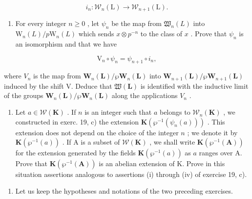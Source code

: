 \[
i _ {n}: \mathcal {W} _ {n} (\mathrm{L}) \rightarrow \mathcal {W} _ {n + 1} (\mathrm{L}).
\]

\begin{enumerate}
\def\labelenumi{\alph{enumi})}
\setcounter{enumi}{1}
\tightlist
\item
  For every integer \(n \geqslant 0\) , let \(\psi_n\) be the map from \(\mathfrak{W}_n(L)\) into \(\mathrm{W}_n(L)/p\mathrm{W}_n(L)\) which sends \(x \otimes p^{-n}\) to the class of \(x\) . Prove that \(\psi_n\) is an isomorphism and that we have
\end{enumerate}

\[
\mathrm{V} _ {n} \circ \psi_ {n} = \psi_ {n + 1} \circ i _ {n},
\]

where \(V_{n}\) is the map from \(\mathbf{W}_{n}(\mathbf{L})/\wp\mathbf{W}_{n}(\mathbf{L})\) into \(\mathbf{W}_{n+1}(\mathbf{L})/\wp\mathbf{W}_{n+1}(\mathbf{L})\) induced by the shift V. Deduce that \(\mathfrak{W}(\mathbf{L})\) is identified with the inductive limit of the groups \(\mathbf{W}_{n}(\mathbf{L})/\wp\mathbf{W}_{n}(\mathbf{L})\) along the applications \(V_{n}\) .

\begin{enumerate}
\def\labelenumi{\alph{enumi})}
\setcounter{enumi}{2}
\tightlist
\item
  Let \(a \in \mathcal{W}(\mathbf{K})\) . If \(n\) is an integer such that \(a\) belongs to \(\mathcal{W}_n(\mathbf{K})\) , we constructed in exerc. 19, c) the extension \(\mathbf{K}(\wp^{-1}(\psi_n(a)))\) . This extension does not depend on the choice of the integer \(n\) ; we denote it by \(\mathbf{K}(\wp^{-1}(a))\) . If A is a subset of \(\mathcal{W}(\mathbf{K})\) , we shall write \(\mathbf{K}(\wp^{-1}(\mathbf{A}))\) for the extension generated by the fields \(\mathbf{K}(\wp^{-1}(a))\) as \(a\) ranges over A. Prove that \(\mathbf{K}(\wp^{-1}(\mathbf{A}))\) is an abelian extension of K. Prove in this situation assertions analogous to assertions (i) through (iv) of exercise 19, c).
\end{enumerate}

\begin{enumerate}
\def\labelenumi{\arabic{enumi})}
\setcounter{enumi}{20}
\tightlist
\item
  Let us keep the hypotheses and notations of the two preceding exercises.
\end{enumerate}

